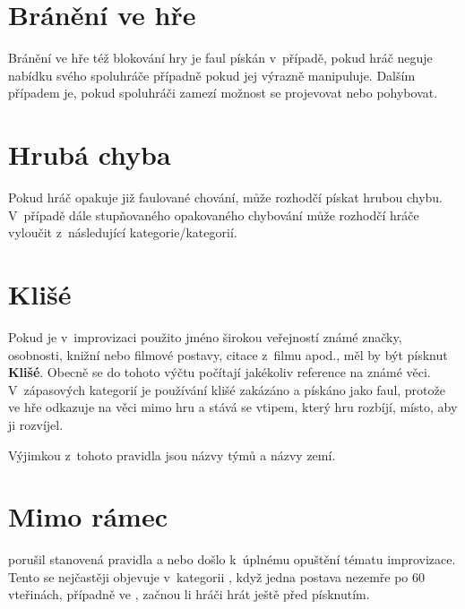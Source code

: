\needspace{5cm} \section{Bránění ve hře} \label{bránění ve hře}  
 
Bránění ve hře též blokování hry je faul pískán v~případě, pokud hráč neguje nabídku svého spoluhráče případně pokud jej výrazně manipuluje. Dalším případem je, pokud spoluhráči zamezí možnost se projevovat nebo pohybovat. 
 
 
\needspace{5cm} \section{Hrubá chyba} \label{hrubá chyba}  
Pokud hráč opakuje již faulované chování, může rozhodčí pískat hrubou chybu. V~případě dále stupňovaného opakovaného chybování může rozhodčí hráče vyloučit z~následující kategorie/kategorií. 
 
\needspace{5cm} \section{Klišé} \label{klišé}  
 
Pokud je v~improvizaci použito jméno širokou veřejností známé značky, osobnosti, knižní nebo filmové postavy, citace z~filmu apod., měl by být písknut  \textbf{Klišé}. Obecně se do tohoto výčtu počítají jakékoliv reference na známé věci. V~zápasových kategorií je používání klišé zakázáno a pískáno jako faul, protože ve hře odkazuje na věci mimo hru a stává se vtipem, který hru rozbíjí, místo, aby ji rozvíjel. 
  
 
Výjimkou z~tohoto pravidla jsou názvy  týmů a názvy zemí. 
 
 
\needspace{5cm} \section{Mimo rámec} \label{mimo rámec}  
 
 porušil stanovená pravidla  a nebo došlo k~úplnému opuštění tématu improvizace. Tento  se nejčastěji objevuje v~kategorii , když jedna postava nezemře po 60 vteřinách, případně ve , začnou li hráči hrát ještě před písknutím. 
 
